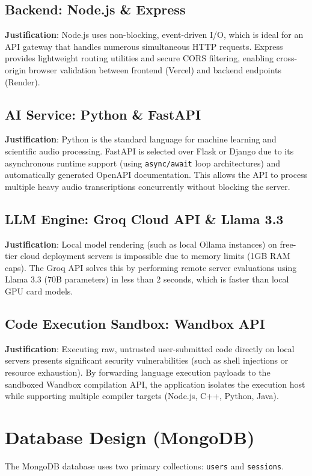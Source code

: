 \documentclass[11pt,a4paper]{article}
\begin{document}
\subsection{Backend: Node.js \& Express}
\textbf{Justification}: Node.js uses non-blocking, event-driven I/O, which is ideal for an API gateway that handles numerous simultaneous HTTP requests. Express provides lightweight routing utilities and secure CORS filtering, enabling cross-origin browser validation between frontend (Vercel) and backend endpoints (Render).

\subsection{AI Service: Python \& FastAPI}
\textbf{Justification}: Python is the standard language for machine learning and scientific audio processing. FastAPI is selected over Flask or Django due to its asynchronous runtime support (using \texttt{async/await} loop architectures) and automatically generated OpenAPI documentation. This allows the API to process multiple heavy audio transcriptions concurrently without blocking the server.

\subsection{LLM Engine: Groq Cloud API \& Llama 3.3}
\textbf{Justification}: Local model rendering (such as local Ollama instances) on free-tier cloud deployment servers is impossible due to memory limits (1GB RAM caps). The Groq API solves this by performing remote server evaluations using Llama 3.3 (70B parameters) in less than 2 seconds, which is faster than local GPU card models.

\subsection{Code Execution Sandbox: Wandbox API}
\textbf{Justification}: Executing raw, untrusted user-submitted code directly on local servers presents significant security vulnerabilities (such as shell injections or resource exhaustion). By forwarding language execution payloads to the sandboxed Wandbox compilation API, the application isolates the execution host while supporting multiple compiler targets (Node.js, C++, Python, Java).

\section{Database Design (MongoDB)}
The MongoDB database uses two primary collections: \texttt{users} and \texttt{sessions}.
\end{document}
